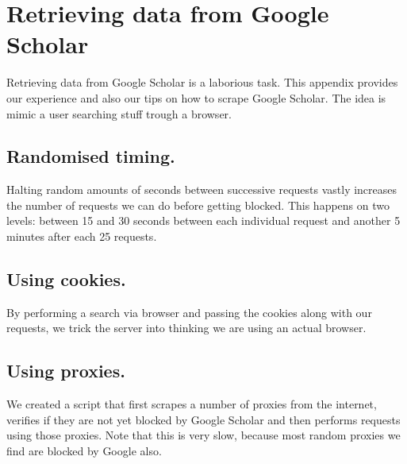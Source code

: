 \section{Retrieving data from Google Scholar}
\label{sec:googlescholar}

Retrieving data from Google Scholar is a laborious task. This appendix provides our experience and also our tips on how to scrape Google Scholar. The idea is mimic a user searching stuff trough a browser.


\subsection{Randomised timing.} Halting random amounts of seconds between successive requests vastly increases the number of requests we can do before getting blocked. This happens on two levels: between 15 and 30 seconds between each individual request and another 5 minutes after each 25 requests. 

\subsection{Using cookies.} By performing a search via browser and passing the cookies along with our requests, we trick the server into thinking we are using an actual browser.

\subsection{Using proxies.} We created a script that first scrapes a number of proxies from the internet, verifies if they are not yet blocked by Google Scholar and then performs requests using those proxies. Note that this is very slow, because most random proxies we find are blocked by Google also.

